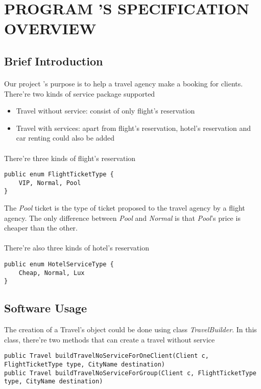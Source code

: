 \section{PROGRAM 'S SPECIFICATION OVERVIEW}

\subsection{Brief Introduction}

\paragraph{}
Our project 's purpose is to help a travel agency make a booking for clients. There're two kinds of service package supported

\begin{itemize}
\item Travel without service: consist of only flight's reservation
\item Travel with services: apart from flight's reservation, hotel's reservation and car renting could also be added
\end{itemize}

\paragraph{}
There're three kinds of flight's reservation

\begin{lstlisting}
public enum FlightTicketType {
	VIP, Normal, Pool
}
\end{lstlisting}
The \textit{Pool} ticket is the type of ticket proposed to the travel agency by a flight agency. The only difference between \textit{Pool} and \textit{Normal} is that \textit{Pool}'s price is cheaper than the other.

\paragraph{}
There're also three kinds of hotel's reservation

\begin{lstlisting}
public enum HotelServiceType {
	Cheap, Normal, Lux
}
\end{lstlisting}

\subsection{Software Usage}

The creation of a Travel's object could be done using class \textit{TravelBuilder}. In this class, there're two methods that can create a travel without service

\begin{lstlisting}
public Travel buildTravelNoServiceForOneClient(Client c, FlightTicketType type, CityName destination)
public Travel buildTravelNoServiceForGroup(Client c, FlightTicketType type, CityName destination)
\end{lstlisting}


